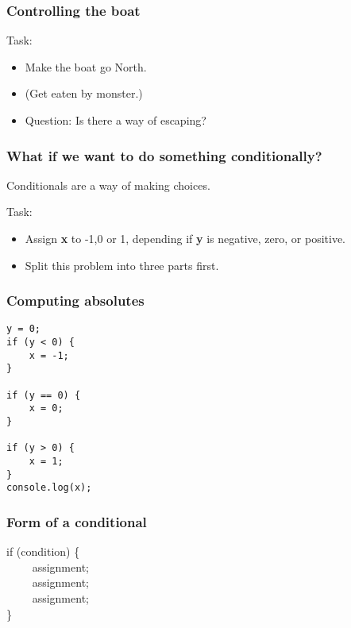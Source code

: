 \documentclass{beamer}
\begin{document}
\begin{frame}[fragile]
\frametitle{Controlling the boat}
\Large 
Task: 
\begin{itemize}
\item Make the boat go North.
\item (Get eaten by monster.)
\end{itemize}
\frameskip{}
\frameskip{}
\begin{itemize}
\item Question: Is there a way of escaping?
\end{itemize}

\end{frame}


\begin{frame}[fragile]
\frametitle{What if we want to do something conditionally?}
\Large
Conditionals are a way of making choices.

Task: 
\begin{itemize}
\item Assign {\bf x} to -1,0 or 1, depending if {\bf y} is negative, zero, or positive.
\item Split this problem into three parts first.
\end{itemize}

\end{frame}

\begin{frame}[fragile]
\frametitle{Computing absolutes}
\large

\begin{codeblock}
\begin{verbatim}
y = 0;
if (y < 0) {
    x = -1;
}

if (y == 0) {
    x = 0;
}

if (y > 0) {
    x = 1;
}
console.log(x);
\end{verbatim}
\end{codeblock}

\end{frame}

\begin{frame}[fragile]
\frametitle{Form of a conditional}
\large

{\Huge if (condition) \{}\\
{\Huge ~~~~ assignment; }\\
{\Huge ~~~~ assignment; }\\
{\Huge ~~~~ assignment; }\\
{\Huge \}}
\end{frame}
\end{document}
